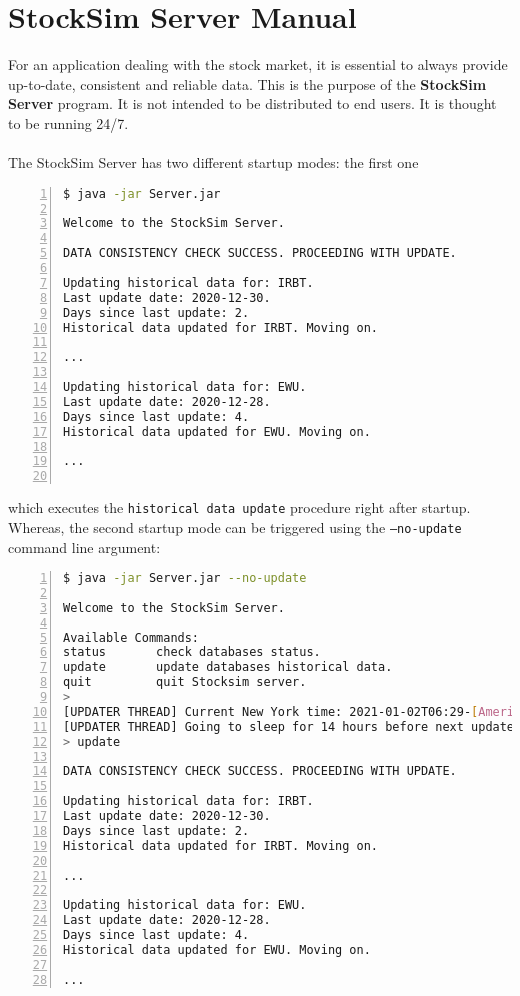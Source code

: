 \chapter{StockSim Server Manual}
For an application dealing with the stock market, it is essential to 
always provide up-to-date, consistent and reliable data. This is the purpose of 
the \textbf{StockSim Server} program. It is not intended to be distributed to 
end users. It is thought to be running 24/7.\\
\\
The StockSim Server has two different startup modes: the first one
\begin{lstlisting}[basicstyle=\footnotesize,language=bash,numbers=left,numberstyle=\footnotesize,numbersep=8pt,frame=single]
$ java -jar Server.jar

Welcome to the StockSim Server.

DATA CONSISTENCY CHECK SUCCESS. PROCEEDING WITH UPDATE.

Updating historical data for: IRBT.
Last update date: 2020-12-30.
Days since last update: 2.
Historical data updated for IRBT. Moving on.

...

Updating historical data for: EWU.
Last update date: 2020-12-28.
Days since last update: 4.
Historical data updated for EWU. Moving on.

...


\end{lstlisting}
which executes the \texttt{historical data update} procedure right after
startup. Whereas, the second startup mode can be triggered using the
\texttt{--no-update} command line argument:
\begin{lstlisting}[basicstyle=\footnotesize,language=bash,numbers=left,numberstyle=\footnotesize,numbersep=8pt,frame=single]
$ java -jar Server.jar --no-update

Welcome to the StockSim Server.

Available Commands:
status       check databases status.                 
update       update databases historical data.       
quit         quit Stocksim server.                   
> 
[UPDATER THREAD] Current New York time: 2021-01-02T06:29-[America/New_York]
[UPDATER THREAD] Going to sleep for 14 hours before next update.
> update

DATA CONSISTENCY CHECK SUCCESS. PROCEEDING WITH UPDATE.

Updating historical data for: IRBT.
Last update date: 2020-12-30.
Days since last update: 2.
Historical data updated for IRBT. Moving on.

...

Updating historical data for: EWU.
Last update date: 2020-12-28.
Days since last update: 4.
Historical data updated for EWU. Moving on.

...

\end{lstlisting}

